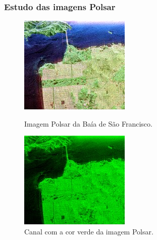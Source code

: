 \documentclass[12pt,a4paper]{article}
\begin{document}
\subsubsection{Estudo das imagens Polsar }

\begin{figure}[hbt]
\begin{minipage}[b]{0.450\linewidth}
\includegraphics[width=\linewidth]{polsar_teste.jpeg}
\caption{Imagem Polsar da Baía de São Francisco.}
\label{fig5:sobel}
\end{minipage}\hfill
\begin{minipage}[b]{0.450\linewidth}
\includegraphics[width=\linewidth]{polsar_green.jpeg}
\caption{Canal com a cor verde da imagem Polsar.}
\label{fig5:Log}
\end{minipage}
\end{figure}
\end{document}
